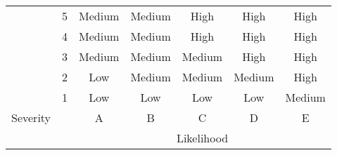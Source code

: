 \begin{table}[]
\begin{tabular}{cc|c|c|c|c|c|}
\hline
\multicolumn{1}{|c|}{}                           & 5                                             & \cellcolor[HTML]{F8FF00}Medium & \cellcolor[HTML]{F8FF00}Medium & \cellcolor[HTML]{FD6864}High   & \cellcolor[HTML]{FD6864}High   & \cellcolor[HTML]{FD6864}High   \\ \cline{2-7} 
\multicolumn{1}{|c|}{}                           & 4                                             & \cellcolor[HTML]{F8FF00}Medium & \cellcolor[HTML]{F8FF00}Medium & \cellcolor[HTML]{FD6864}High   & \cellcolor[HTML]{FD6864}High   & \cellcolor[HTML]{FD6864}High   \\ \cline{2-7} 
\multicolumn{1}{|c|}{}                           & 3                                             & \cellcolor[HTML]{F8FF00}Medium & \cellcolor[HTML]{F8FF00}Medium & \cellcolor[HTML]{F8FF00}Medium & \cellcolor[HTML]{FD6864}High   & \cellcolor[HTML]{FD6864}High   \\ \cline{2-7} 
\multicolumn{1}{|c|}{}                           & 2                                             & \cellcolor[HTML]{34FF34}Low    & \cellcolor[HTML]{F8FF00}Medium & \cellcolor[HTML]{F8FF00}Medium & \cellcolor[HTML]{F8FF00}Medium & \cellcolor[HTML]{FD6864}High   \\ \cline{2-7} 
\multicolumn{1}{|c|}{}                           & 1                                             & \cellcolor[HTML]{34FF34}Low    & \cellcolor[HTML]{34FF34}Low    & \cellcolor[HTML]{34FF34}Low    & \cellcolor[HTML]{34FF34}Low    & \cellcolor[HTML]{F8FF00}Medium \\ \cline{2-7} 
\multicolumn{1}{|c|}{\multirow{-6}{*}{Severity}} & \cellcolor[HTML]{C0C0C0}                      & A                              & B                              & C                              & D                              & E                              \\ \hline
\multicolumn{1}{l}{\cellcolor[HTML]{FFFFFF}}     & \multicolumn{1}{l|}{\cellcolor[HTML]{FFFFFF}} & \multicolumn{5}{c|}{Likelihood}                                                                                                                                    \\ \cline{3-7} 
\end{tabular}
\end{table}


